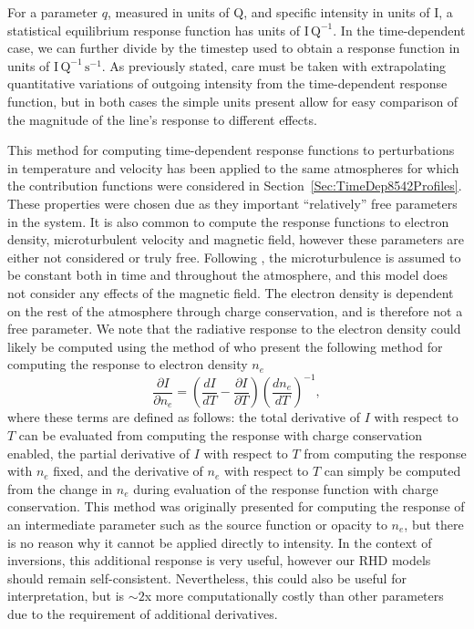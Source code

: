 For a parameter $q$, measured in units of Q, and specific intensity in units of I, a statistical equilibrium response function has units of $\mathrm{I}\,\mathrm{Q}^{-1}$.
In the time-dependent case, we can further divide by the timestep used to obtain a response function in units of $\mathrm{I}\,\mathrm{Q}^{-1}\,\mathrm{s}^{-1}$.
As previously stated, care must be taken with extrapolating quantitative variations of outgoing intensity from the time-dependent response function, but in both cases the simple units present allow for easy comparison of the magnitude of the line's response to different effects.

This method for computing time-dependent response functions to perturbations in temperature and velocity has been applied to the same atmospheres for which the contribution functions were considered in Section~\ref{Sec:TimeDep8542Profiles}.
These properties were chosen due as they important ``relatively'' free parameters in the system.
It is also common to compute the response functions to electron density, microturbulent velocity and magnetic field, however these parameters are either not considered or truly free.
Following \Radyn{}, the microturbulence is assumed to be constant both in time and throughout the atmosphere, and this model does not consider any effects of the magnetic field.
The electron density is dependent on the rest of the atmosphere through charge conservation, and is therefore not a free parameter.
We note that the radiative response to the electron density could likely be computed using the method of \citet{Metcalf1990a} who present the following method for computing the response to electron density $n_e$
\begin{equation}
    \frac{\partial I}{\partial n_e} = \left( \frac{dI}{dT} - \frac{\partial I}{\partial T} \right)\left( \frac{d n_e}{dT} \right)^{-1},
\end{equation}
where these terms are defined as follows: the total derivative of $I$ with respect to $T$ can be evaluated from computing the response with charge conservation enabled, the partial derivative of $I$ with respect to $T$ from computing the response with $n_e$ fixed, and the derivative of $n_e$ with respect to $T$ can simply be computed from the change in $n_e$ during evaluation of the response function with charge conservation.
This method was originally presented for computing the response of an intermediate parameter such as the source function or opacity to $n_e$, but there is no reason why it cannot be applied directly to intensity.
In the context of inversions, this additional response is very useful, however our RHD models should remain self-consistent.
Nevertheless, this could also be useful for interpretation, but is $\sim2$x more computationally costly than other parameters due to the requirement of additional derivatives.


